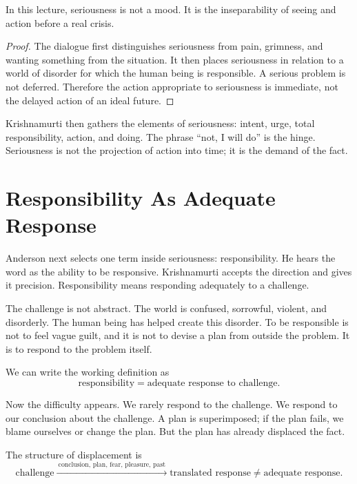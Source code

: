 \begin{proposition}
In this lecture, seriousness is not a mood. It is the inseparability of seeing and action before a real crisis.
\end{proposition}

\begin{proof}
The dialogue first distinguishes seriousness from pain, grimness, and wanting something from the situation. It then places seriousness in relation to a world of disorder for which the human being is responsible. A serious problem is not deferred. Therefore the action appropriate to seriousness is immediate, not the delayed action of an ideal future.
\end{proof}

Krishnamurti then gathers the elements of seriousness: intent, urge, total responsibility, action, and doing. The phrase ``not, I will do'' is the hinge. Seriousness is not the projection of action into time; it is the demand of the fact.

\section{Responsibility As Adequate Response}

Anderson next selects one term inside seriousness: responsibility. He hears the word as the ability to be responsive. Krishnamurti accepts the direction and gives it precision. Responsibility means responding adequately to a challenge.

The challenge is not abstract. The world is confused, sorrowful, violent, and disorderly. The human being has helped create this disorder. To be responsible is not to feel vague guilt, and it is not to devise a plan from outside the problem. It is to respond to the problem itself.

We can write the working definition as
\begin{equation}
\text{responsibility}
=
\text{adequate response to challenge}.
\end{equation}

Now the difficulty appears. We rarely respond to the challenge. We respond to our conclusion about the challenge. A plan is superimposed; if the plan fails, we blame ourselves or change the plan. But the plan has already displaced the fact.

The structure of displacement is
\begin{equation}
\text{challenge}
\xrightarrow{\ \text{conclusion, plan, fear, pleasure, past}\ }
\text{translated response}
\neq
\text{adequate response}.
\end{equation}

